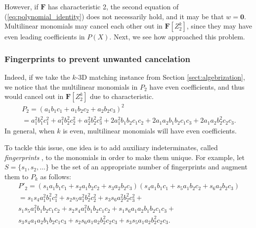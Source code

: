 However, if $\mathbf{F}$ has characteristic 2, the second equation of (\ref{eq:polynomial_identity}) 
does not necessarily hold, and it may be that $w = \mathbf{0}$. Multilinear monomials may 
cancel each other out in $\mathbf{F}[Z_2^k]$, since they may have even leading 
coefficients in $P(X)$. Next, we see how \citeauthor{Koutis08} approached this problem.

\subsubsection{Fingerprints to prevent unwanted cancelation}
\label{sect:fingerprints}

Indeed, if we take the $k$-3D matching instance from Section \ref{sect:algebrization}, 
we notice that the multilinear monomials in $P_2$ have even coefficients, and thus 
would cancel out in $\mathbf{F}[Z_2^k]$ due to characteristic.
\begin{multline*}
  P_2 = (a_1b_1c_1 + a_1b_2c_2 + a_2b_2c_3)^2  \\
  = a_1^2b_1^2c_1^2 + a_1^2b_2^2c_2^2 + a_2^2b_2^2c_3^2 + %
  2a_1^2b_1b_2c_1c_2 + 2a_1a_2b_1b_2c_1c_3 + 2 a_1a_2b_2^2c_2c_3. 
\end{multline*}
In general, when $k$ is even, multilinear monomials will have even coefficients. 

To tackle this issue, one idea is to add auxiliary indeterminates, 
called \emph{fingerprints} \cite{KouWil15}, to the monomials 
in order to make them unique. For example, let $S = \{s_1, s_2, \ldots\}$ 
be the set of an appropriate number of fingerprints 
and augment them to $P_k$ as follows: 
\begin{multline*}
  P'_2 = (s_1a_1b_1c_1 + s_2a_1b_2c_2 + s_3a_2b_2c_3)(s_4a_1b_1c_1 + s_5a_1b_2c_2 + s_6a_2b_2c_3) \\
  = s_1s_4a_1^2b_1^2c_1^2 + s_2s_5a_1^2b_2^2c_2^2 + s_3s_6a_2^2b_2^2c_3^2 + \\
  s_1s_5a_1^2b_1b_2c_1c_2 + s_2s_4a_1^2b_1b_2c_1c_2 + s_1s_6a_1a_2b_1b_2c_1c_3 + \\
  s_3s_4a_1a_2b_1b_2c_1c_3 + s_2s_6a_1a_2b_2^2c_2c_3 + s_3s_5a_1a_2b_2^2c_2c_3. 
\end{multline*}

